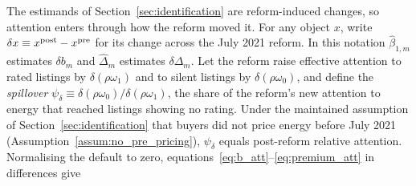 The estimands of Section~\ref{sec:identification} are reform-induced changes, so attention enters through how the reform moved it. For any object $x$, write $\delta x\equiv x^{\rm post}-x^{\rm pre}$ for its change across the July 2021 reform. In this notation $\hat\beta_{1,m}$ estimates $\delta b_m$ and $\hat\Delta_m$ estimates $\delta\Delta_m$. Let the reform raise effective attention to rated listings by $\delta(\rho\omega_1)$ and to silent listings by $\delta(\rho\omega_0)$, and define the \emph{spillover} $\psi_\delta\equiv\delta(\rho\omega_0)/\delta(\rho\omega_1)$, the share of the reform's new attention to energy that reached listings showing no rating. Under the maintained assumption of Section~\ref{sec:identification} that buyers did not price energy before July 2021 (Assumption~\ref{assum:no_pre_pricing}), $\psi_\delta$ equals post-reform relative attention. Normalising the default to zero, equations~\eqref{eq:b_att}--\eqref{eq:premium_att} in differences give
